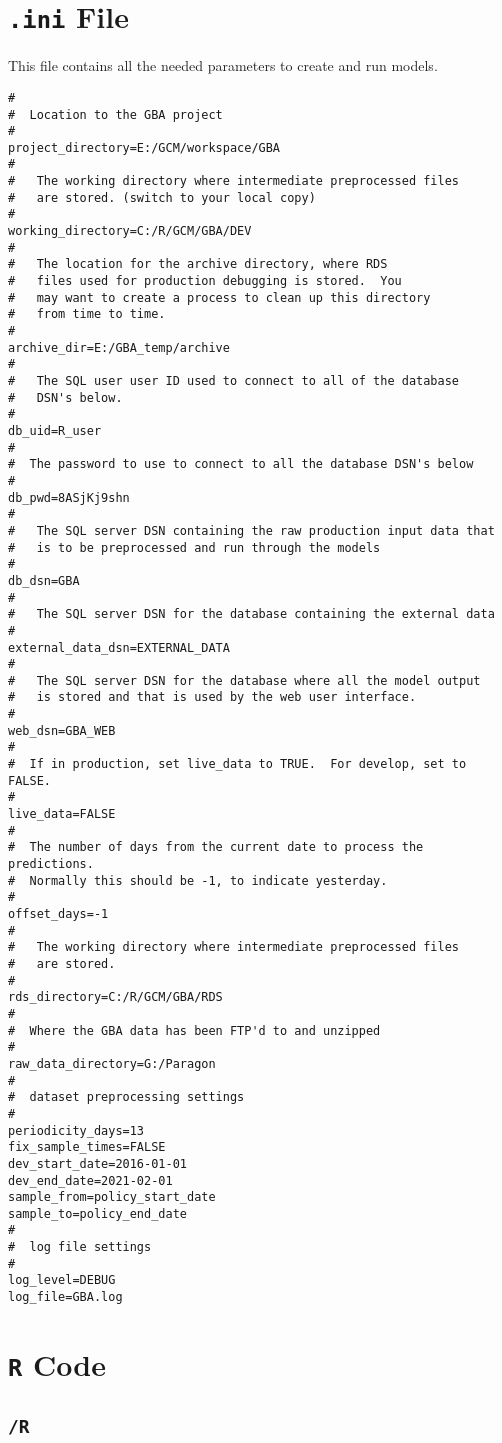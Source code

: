 \documentclass[
]{book}
\begin{document}
\hypertarget{ini-file}{%
\section{\texorpdfstring{\texttt{.ini} File}{.ini File}}\label{ini-file}}

This file contains all the needed parameters to create and run models.

\begin{verbatim}
#
#  Location to the GBA project
#
project_directory=E:/GCM/workspace/GBA
#
#   The working directory where intermediate preprocessed files
#   are stored. (switch to your local copy)
#
working_directory=C:/R/GCM/GBA/DEV
#
#   The location for the archive directory, where RDS
#   files used for production debugging is stored.  You
#   may want to create a process to clean up this directory
#   from time to time.
#
archive_dir=E:/GBA_temp/archive
#
#   The SQL user user ID used to connect to all of the database
#   DSN's below.
#
db_uid=R_user
#
#  The password to use to connect to all the database DSN's below
#
db_pwd=8ASjKj9shn
#
#   The SQL server DSN containing the raw production input data that 
#   is to be preprocessed and run through the models
#
db_dsn=GBA
#
#   The SQL server DSN for the database containing the external data
#
external_data_dsn=EXTERNAL_DATA
#
#   The SQL server DSN for the database where all the model output
#   is stored and that is used by the web user interface.
#
web_dsn=GBA_WEB
#
#  If in production, set live_data to TRUE.  For develop, set to FALSE.
#
live_data=FALSE
#
#  The number of days from the current date to process the predictions.  
#  Normally this should be -1, to indicate yesterday.
#
offset_days=-1
#
#   The working directory where intermediate preprocessed files
#   are stored.
#
rds_directory=C:/R/GCM/GBA/RDS
#
#  Where the GBA data has been FTP'd to and unzipped
#
raw_data_directory=G:/Paragon
#
#  dataset preprocessing settings
#
periodicity_days=13
fix_sample_times=FALSE
dev_start_date=2016-01-01
dev_end_date=2021-02-01
sample_from=policy_start_date
sample_to=policy_end_date
#
#  log file settings
#
log_level=DEBUG
log_file=GBA.log
\end{verbatim}

\hypertarget{r-code}{%
\section{\texorpdfstring{\texttt{R} Code}{R Code}}\label{r-code}}

\hypertarget{r}{%
\subsection{\texorpdfstring{\texttt{/R}}{/R}}\label{r}}
\end{document}
